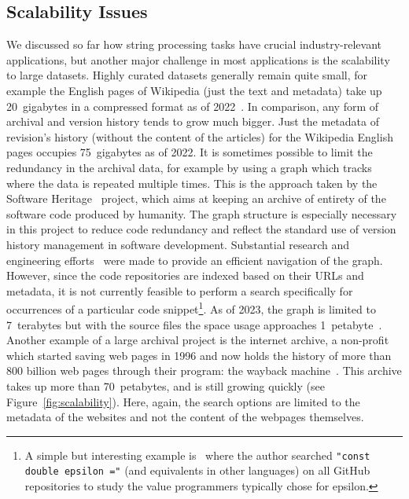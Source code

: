 \subsection{Scalability Issues}\label{sec:intro:scalability}

 
We discussed so far how string processing tasks have crucial industry-relevant applications, but another major challenge in most applications is the scalability to large datasets.
Highly curated datasets generally remain quite small, for example the English pages of Wikipedia (just the text and metadata) take up 20~gigabytes in a compressed format as of 2022~\cite{wikimedia}. In comparison, any form of archival and version history tends to grow much bigger. Just the metadata of revision's history (without the content of the articles) for the Wikipedia English pages occupies 75~gigabytes as of 2022.
It is sometimes possible to limit the redundancy in the archival data, for example by using a graph which tracks where the data is repeated multiple times. This is the approach taken by the Software Heritage~\cite{swh-site} project, which aims at keeping an archive of entirety of the software code produced by humanity. The graph structure is especially necessary in this project to reduce code redundancy and reflect the standard use of version history management in software development.
Substantial research and engineering efforts~\cite{DBLP:phd/hal/Pietri21} were made to provide an efficient navigation of the graph. 
However, since the code repositories are indexed based on their URLs and metadata, it is not currently feasible to perform a search specifically for occurrences of a particular code snippet\footnote{\setlength\parindent{10pt} A simple but interesting example is~\cite{vii2014if} where the author searched \texttt{"const double epsilon ="} (and equivalents in other languages) on all GitHub repositories to study the value programmers typically chose for epsilon.}.
As of 2023, the graph is limited to 7~terabytes but with the source files the space usage approaches 1~petabyte~\cite{swh-polytechnique}.
Another example of a large archival project is the internet archive, a non-profit which started saving web pages in 1996 and now holds the history of more than 800 billion web pages through their program: the wayback machine~\cite{web-archive}. This archive takes up more than 70~petabytes, and is still growing quickly (see Figure~\ref{fig:scalability}).
Here, again, the search options are limited to the metadata of the websites and not the content of the webpages themselves.


